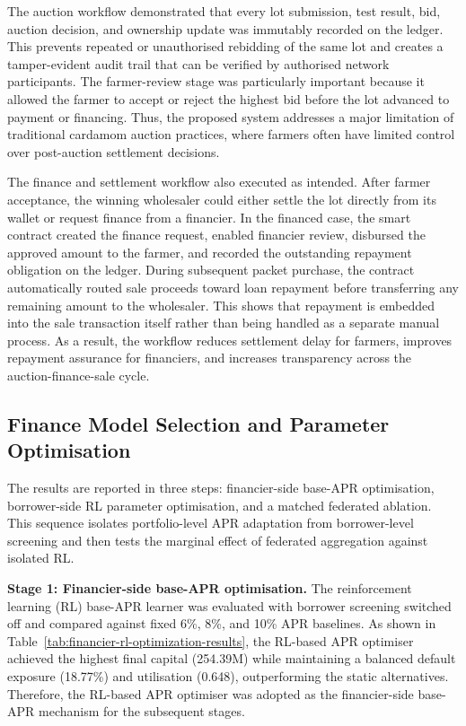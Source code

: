 \documentclass[12pt]{article}
\begin{document}
	The auction workflow demonstrated that every lot submission, test result, bid, auction decision, and ownership update was immutably recorded on the ledger. This prevents repeated or unauthorised rebidding of the same lot and creates a tamper-evident audit trail that can be verified by authorised network participants. The farmer-review stage was particularly important because it allowed the farmer to accept or reject the highest bid before the lot advanced to payment or financing. Thus, the proposed system addresses a major limitation of traditional cardamom auction practices, where farmers often have limited control over post-auction settlement decisions.
	
	The finance and settlement workflow also executed as intended. After farmer acceptance, the winning wholesaler could either settle the lot directly from its wallet or request finance from a financier. In the financed case, the smart contract created the finance request, enabled financier review, disbursed the approved amount to the farmer, and recorded the outstanding repayment obligation on the ledger. During subsequent packet purchase, the contract automatically routed sale proceeds toward loan repayment before transferring any remaining amount to the wholesaler. This shows that repayment is embedded into the sale transaction itself rather than being handled as a separate manual process. As a result, the workflow reduces settlement delay for farmers, improves repayment assurance for financiers, and increases transparency across the auction-finance-sale cycle.

\subsection{Finance Model Selection and Parameter Optimisation}

The results are reported in three steps: financier-side base-APR optimisation, borrower-side RL parameter optimisation, and a matched federated ablation. This sequence isolates portfolio-level APR adaptation from borrower-level screening and then tests the marginal effect of federated aggregation against isolated RL.

\textbf{Stage 1: Financier-side base-APR optimisation.} The reinforcement learning (RL) base-APR learner was evaluated with borrower screening switched off and compared against fixed 6\%, 8\%, and 10\% APR baselines. As shown in Table~\ref{tab:financier-rl-optimization-results}, the RL-based APR optimiser achieved the highest final capital (254.39M) while maintaining a balanced default exposure (18.77\%) and utilisation (0.648), outperforming the static alternatives. Therefore, the RL-based APR optimiser was adopted as the financier-side base-APR mechanism for the subsequent stages.
	
\end{document}
